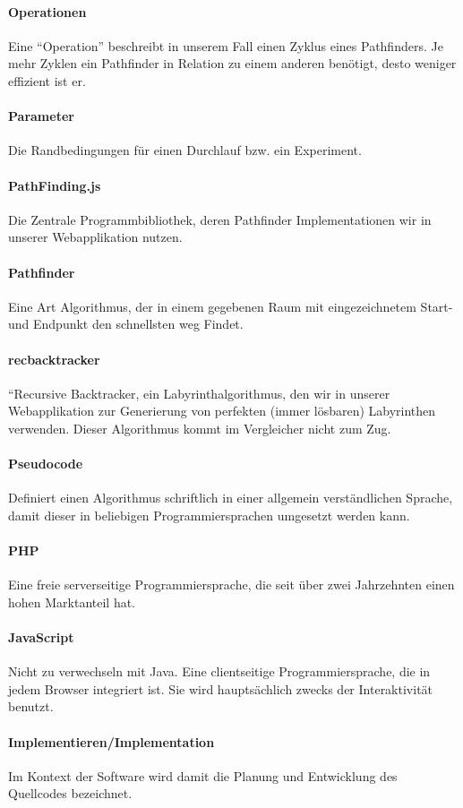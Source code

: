\documentclass[12pt,a4paper,german]{report}
\begin{document}
\paragraph{Operationen} Eine ``Operation'' beschreibt in unserem Fall einen Zyklus eines Pathfinders. Je mehr Zyklen ein Pathfinder in Relation zu einem anderen benötigt, desto weniger effizient ist er.
\paragraph{Parameter} Die Randbedingungen für einen Durchlauf bzw. ein Experiment.
\paragraph{PathFinding.js} Die Zentrale Programmbibliothek, deren Pathfinder Implementationen wir in unserer Webapplikation nutzen.
\paragraph{Pathfinder} Eine Art Algorithmus, der in einem gegebenen Raum mit eingezeichnetem Start- und Endpunkt den schnellsten weg Findet.
\paragraph{recbacktracker} ``Recursive Backtracker, ein Labyrinthalgorithmus, den wir in unserer Webapplikation zur Generierung von perfekten (immer lösbaren) Labyrinthen verwenden. Dieser Algorithmus kommt im Vergleicher nicht zum Zug.
\paragraph{Pseudocode} Definiert einen Algorithmus schriftlich in einer allgemein verständlichen Sprache, damit dieser in beliebigen Programmiersprachen umgesetzt werden kann.
\paragraph{PHP} Eine freie serverseitige Programmiersprache, die seit über zwei Jahrzehnten einen hohen Marktanteil hat.
\paragraph{JavaScript} Nicht zu verwechseln mit Java. Eine clientseitige Programmiersprache, die in jedem Browser integriert ist. Sie wird hauptsächlich zwecks der Interaktivität benutzt. 
\paragraph{Implementieren/Implementation} Im Kontext der Software wird damit die Planung und Entwicklung des Quellcodes bezeichnet.
\end{document}
